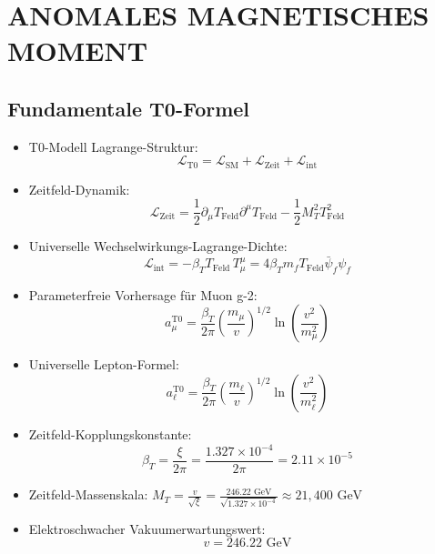 \documentclass[12pt,a4paper]{article}
\begin{document}
	\section{ANOMALES MAGNETISCHES MOMENT}

\subsection{Fundamentale T0-Formel}
\begin{itemize}
	\item T0-Modell Lagrange-Struktur:
	$$\mathcal{L}_{\text{T0}} = \mathcal{L}_{\text{SM}} + \mathcal{L}_{\text{Zeit}} + \mathcal{L}_{\text{int}}$$
	
	\item Zeitfeld-Dynamik:
	$$\mathcal{L}_{\text{Zeit}} = \frac{1}{2}\partial_\mu T_{\text{Feld}} \partial^\mu T_{\text{Feld}} - \frac{1}{2}M_T^2 T_{\text{Feld}}^2$$
	
	\item Universelle Wechselwirkungs-Lagrange-Dichte:
	$$\mathcal{L}_{\text{int}} = -\beta_T T_{\text{Feld}} \, T^\mu_\mu = 4\beta_T m_f T_{\text{Feld}} \bar{\psi}_f \psi_f$$
	
	\item Parameterfreie Vorhersage für Muon g-2:
	$$\boxed{a_\mu^{\text{T0}} = \frac{\beta_T}{2\pi} \left(\frac{m_\mu}{v}\right)^{1/2} \ln\left(\frac{v^2}{m_\mu^2}\right)}$$
	
	\item Universelle Lepton-Formel:
	$$\boxed{a_\ell^{\text{T0}} = \frac{\beta_T}{2\pi} \left(\frac{m_\ell}{v}\right)^{1/2} \ln\left(\frac{v^2}{m_\ell^2}\right)}$$
	
	\item Zeitfeld-Kopplungskonstante:
	$$\beta_T = \frac{\xi}{2\pi} = \frac{1.327 \times 10^{-4}}{2\pi} = 2.11 \times 10^{-5}$$
	
	\item Zeitfeld-Massenskala:
	$M_T = \frac{v}{\sqrt{\xi}} = \frac{246.22 \text{ GeV}}{\sqrt{1.327 \times 10^{-4}}} \approx 21,400 \text{ GeV}$
	
	\item Elektroschwacher Vakuumerwartungswert:
	$$v = 246.22 \text{ GeV}$$
\end{itemize}
\end{document}
